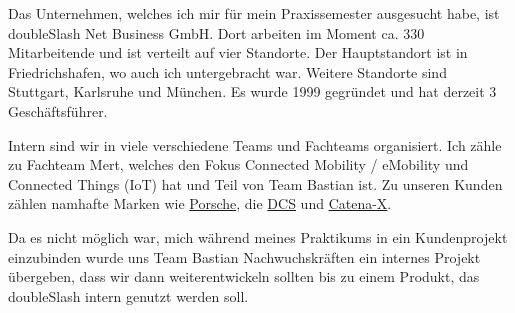 
Das Unternehmen, welches ich mir für mein Praxissemester ausgesucht habe, ist doubleSlash Net Business 
GmbH. Dort arbeiten im Moment ca. 330 Mitarbeitende und ist verteilt auf vier Standorte. 
Der Hauptstandort ist in Friedrichshafen, wo auch ich untergebracht war. Weitere Standorte sind  
Stuttgart, Karlsruhe und München. Es wurde 1999 gegründet und hat derzeit 3 Geschäftsführer. 

Intern sind wir in viele verschiedene Teams und Fachteams organisiert. Ich zähle zu Fachteam Mert, welches den Fokus 
Connected Mobility / eMobility und Connected Things (IoT) hat und Teil von Team Bastian ist. Zu unseren Kunden zählen namhafte Marken
wie \href{https://www.porsche.com/}{Porsche}, die \href{https://digitalchargingsolutions.com/web/dcs-global}{DCS} und \href{https://catena-x.net/en/}{Catena-X}.

Da es nicht möglich war, mich während meines Praktikums in ein Kundenprojekt einzubinden wurde uns Team Bastian Nachwuchskräften ein 
internes Projekt übergeben, dass wir dann weiterentwickeln sollten bis zu einem Produkt, das doubleSlash intern genutzt werden soll.
